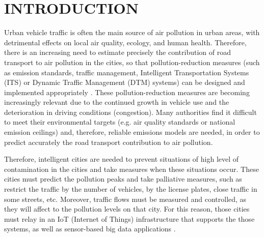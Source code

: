 \documentclass{pre-tfg}
\title{\REDNOTE{Título del TFG}}%
\author{José Ángel Martín Baos}
\begin{document}
\maketitle
\tableofcontents

\newpage


\section{INTRODUCTION} %

Urban vehicle traffic is often the main source of air pollution in urban areas, with detrimental
effects on local air quality, ecology, and human health. Therefore, there is an increasing
need to estimate precisely the contribution of road transport to air pollution in the
cities, so that pollution-reduction measures (such as emission standards, traffic management,
Intelligent Transportation Systems (ITS) or Dynamic Traffic Management (DTM) systems)
can be designed and implemented appropriately \cite{SNB10}. These pollution-reduction measures
are becoming increasingly relevant due to the continued growth in vehicle use and the
deterioration in driving conditions (congestion). Many authorities find it difficult to meet
their environmental targets (e.g. air quality standards or national emission ceilings) and,
therefore, reliable emissions models are needed, in order to predict accurately the road transport
contribution to air pollution.

Therefore, intelligent cities are needed to prevent situations of high level of contamination in the cities and take measures when these situations occur. These cities must predict the pollution peaks and take palliative measures, such as restrict the traffic by the number of vehicles, by the license plates, close traffic in some streets, etc. Moreover, traffic flows must be measured and controlled, as they will affect to the pollution levels on that city. For this reason, those cities must relay in an IoT (Internet of Things) infrastructure that supports the those systems, as well as sensor-based big data applications \cite{Bib18}.


\end{document}
